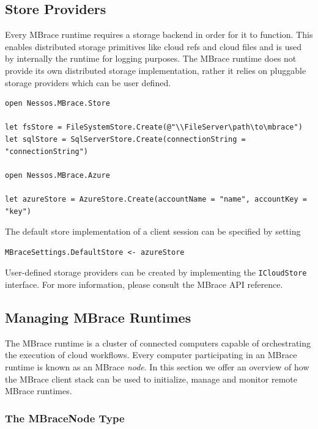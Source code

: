 \documentclass[9pt,a4paper]{article}
\newcommand{\mbrace}{MBrace}
\newcommand{\TitularMbrace}{MBrace}
\begin{document}
\subsection{Store Providers}

Every \mbrace{} runtime requires a storage backend in order for it to function.
This enables distributed storage primitives like cloud refs and cloud files and
is used by internally the runtime for logging purposes.
The \mbrace{} runtime does not provide its own distributed storage implementation, 
rather it relies on pluggable storage providers which can be user defined.
\begin{lstlisting}
open Nessos.MBrace.Store

let fsStore = FileSystemStore.Create(@"\\FileServer\path\to\mbrace")
let sqlStore = SqlServerStore.Create(connectionString = "connectionString")

open Nessos.MBrace.Azure

let azureStore = AzureStore.Create(accountName = "name", accountKey = "key")
\end{lstlisting}
The default store implementation of a client session can be specified by setting
\begin{lstlisting}
MBraceSettings.DefaultStore <- azureStore
\end{lstlisting}
User-defined storage providers can be created by implementing the \texttt{ICloudStore} interface. 
For more information, please consult the \mbrace{} API reference.

\subsection{Managing \TitularMbrace{} Runtimes}

The \mbrace{} runtime is a cluster of connected computers capable of orchestrating the execution
of cloud workflows. Every computer participating in an \mbrace{} runtime is known as an \mbrace{}
\emph{node}. In this section we offer an overview of how the \mbrace{} client stack can be
used to initialize, manage and monitor remote \mbrace{} runtimes.

\subsubsection*{The MBraceNode Type}
\end{document}
